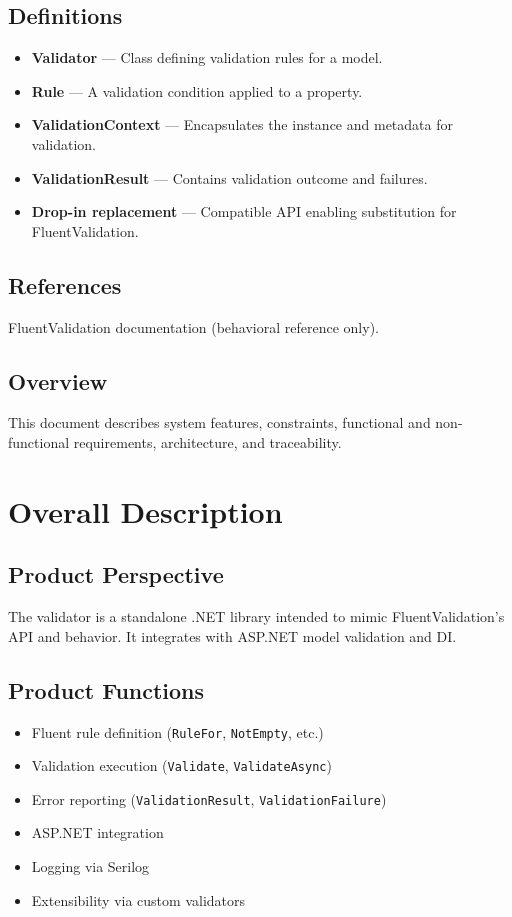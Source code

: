 \documentclass[12pt,technote]{IEEEtran}
\begin{document}
\subsection{Definitions}
\begin{itemize}[noitemsep]
    \item \textbf{Validator} — Class defining validation rules for a model.
    \item \textbf{Rule} — A validation condition applied to a property.
    \item \textbf{ValidationContext} — Encapsulates the instance and metadata for validation.
    \item \textbf{ValidationResult} — Contains validation outcome and failures.
    \item \textbf{Drop-in replacement} — Compatible API enabling substitution for FluentValidation.
\end{itemize}

\subsection{References}
FluentValidation documentation (behavioral reference only).

\subsection{Overview}
This document describes system features, constraints, functional and non-functional requirements, architecture, and traceability.

\section{Overall Description}

\subsection{Product Perspective}
The validator is a standalone .NET library intended to mimic FluentValidation’s API and behavior. It integrates with ASP.NET model validation and DI.

\subsection{Product Functions}
\begin{itemize}[noitemsep]
    \item Fluent rule definition (\texttt{RuleFor}, \texttt{NotEmpty}, etc.)
    \item Validation execution (\texttt{Validate}, \texttt{ValidateAsync})
    \item Error reporting (\texttt{ValidationResult}, \texttt{ValidationFailure})
    \item ASP.NET integration
    \item Logging via Serilog
    \item Extensibility via custom validators
\end{itemize}
\end{document}
